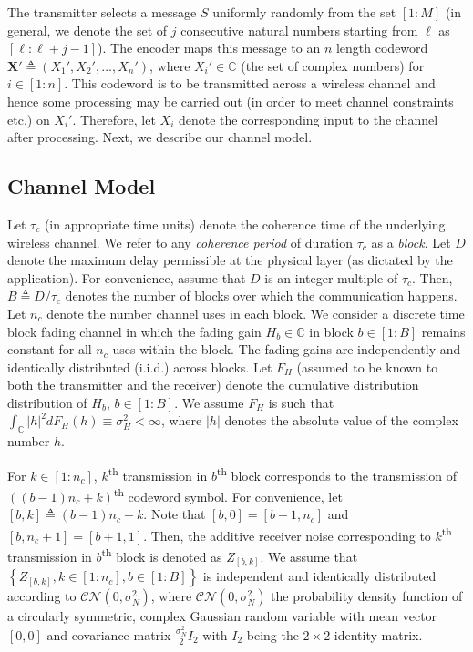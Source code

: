 \documentclass[conference]{IEEEtran}
\begin{document}
The transmitter selects a message $S$ uniformly randomly from the set $[1:M]$ (in general, we denote the set of $j$ consecutive natural numbers starting from $\ell$  as $[\ell:\ell+j-1]$). The encoder maps this message to an $n$ length codeword $\mathbf{X}'\triangleq \left(X_{1}',X_{2}',\dots, X_{n}'\right)$, where $X_{i}'\in\mathbb{C}$ (the set of complex numbers) for $i\in[1:n]$. This codeword is to be transmitted across a wireless channel and hence some processing may be carried out (in order to meet channel constraints etc.) on $X_i'$. Therefore, let $X_i$ denote the corresponding input to the channel after processing. Next, we describe our channel model. 

\subsection{Channel Model}
Let $\tau_c$ (in appropriate time units) denote the coherence time of the underlying wireless channel. We refer to any \emph{coherence period} of duration $\tau_c$ as a \emph{block}. Let $D$ denote the maximum delay permissible at the physical layer (as dictated by the application). For convenience, assume that $D$ is an integer multiple of $\tau_c$. Then, $B\triangleq D/\tau_c$ denotes the number of blocks over which the communication happens.   Let $n_c$ denote the number channel uses in each block. We consider a discrete time block fading channel in which the fading gain $H_b\in\mathbb{C}$ in block $b\in[1:B]$ remains constant for all $n_c$ uses within the block. The fading gains are independently and identically distributed (i.i.d.) across blocks.  Let $F_{H}$ (assumed to be known to both the transmitter and the receiver) denote the cumulative distribution distribution of $H_b$, $b\in[1:B]$. We assume $F_{H}$ is such that $\int_{\mathbb{C}}|h|^2dF_H(h)\equiv \sigma_H^2<\infty$, where $|h|$ denotes the absolute value of the complex number $h$. 
\par For $k\in[1:n_c]$, $k$\textsuperscript{th} transmission in $b$\textsuperscript{th} block corresponds to the transmission of $\left((b-1)n_c+k\right)$\textsuperscript{th} codeword symbol. For convenience, let $[b, k]\triangleq (b-1)n_c+k$. Note that $[b, 0] = [b-1, n_c]$ and $[b, n_c+1] = [b+1, 1]$. Then, the additive receiver noise corresponding   to $k$\textsuperscript{th} transmission in $b$\textsuperscript{th} block is denoted as $Z_{[b,k]}$. We assume that $\left\{Z_{[b,k]},k\in[1:n_c],b\in[1:B]\right\}$ is independent and identically distributed according to $\mathcal{C}\mathcal{N}\left(0,\sigma_N^2\right)$, where $\mathcal{C}\mathcal{N}\left(0,\sigma_N^2\right)$ the probability density function of a circularly symmetric, complex Gaussian random variable  with mean vector $[0,0]$ and covariance matrix $\frac{\sigma_N^2}{2}I_2$ with $I_2$ being the $2\times 2$ identity matrix.
\end{document}
